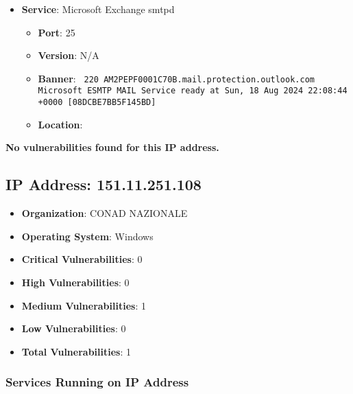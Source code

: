 \documentclass{article}
\begin{document}
\begin{itemize}
    
        \item \textbf{Service}: Microsoft Exchange smtpd
        \begin{itemize}
            \item \textbf{Port}: 25
            \item \textbf{Version}:  N/A 
            \item \textbf{Banner}: \texttt{ 220 AM2PEPF0001C70B.mail.protection.outlook.com Microsoft ESMTP MAIL Service ready at Sun, 18 Aug 2024 22:08:44 +0000 [08DCBE7BB5F145BD]
 }
            \item \textbf{Location}: \href{  }{  }
        \end{itemize}
    
\end{itemize}


\textbf{No vulnerabilities found for this IP address.}


\clearpage



\subsection*{IP Address: 151.11.251.108}

\begin{itemize}
    \item \textbf{Organization}: CONAD NAZIONALE
    \item \textbf{Operating System}:  Windows 
    \item \textbf{Critical Vulnerabilities}: 0
    \item \textbf{High Vulnerabilities}: 0
    \item \textbf{Medium Vulnerabilities}: 1
    \item \textbf{Low Vulnerabilities}: 0
    \item \textbf{Total Vulnerabilities}: 1
\end{itemize}

\subsubsection*{Services Running on IP Address}
\end{document}
